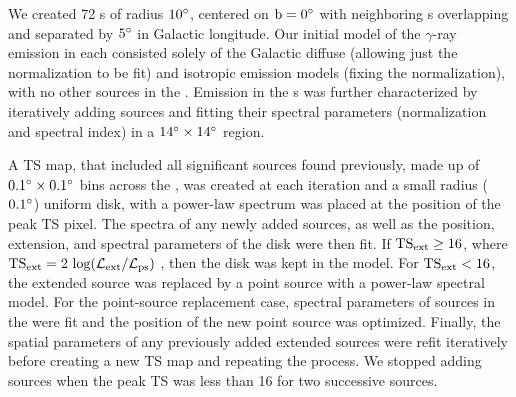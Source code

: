 We created 72 \roi{}s of radius ${\rm 10^{\circ}}$, centered on ${\rm b = 0^{\circ}}$ with neighboring \roi{}s overlapping and separated by ${\rm 5^{\circ}}$ in Galactic longitude.  Our initial model of the $\gamma$-ray emission in each \roi{} consisted solely of the Galactic diffuse (allowing just the normalization to be fit) and isotropic emission models (fixing the normalization), with no other sources in the \roi{}. Emission in the \roi{}s was further characterized by iteratively adding sources and fitting their spectral parameters (normalization and spectral index) in a ${\rm 14^{\circ}}\times{\rm 14^{\circ}}$ region. 

A TS map, that included all significant sources found previously, made up of ${\rm 0.1^{\circ}}\times{\rm 0.1^{\circ}}$ bins across the \roi{}, was created at each iteration and a small radius (${\rm 0.1^{\circ}}$) uniform disk, with a power-law spectrum was placed at the position of the peak TS pixel. The spectra of any newly added sources, as well as the position, extension, and spectral parameters of the disk were then fit. If $\rm TS_{ext} \geq 16$, where  ${\rm TS_{ext} = 2~log(\mathcal{L}_{ext} / \mathcal{L}_{ps})}$ \citep[\ie{} twice the log-likelihood ratio of an extended to a point source,][]{Lande12}, then the disk was kept in the model. For $\rm TS_{ext} < 16$, the extended source was replaced by a point source with a power-law spectral model. For the point-source replacement case, spectral parameters of sources in the \roi{} were fit and the position of the new point source was optimized. Finally, the spatial parameters of any previously added extended sources were refit iteratively before creating a new TS map and repeating the process. We stopped adding sources when the peak TS was less than 16 for two successive sources. 

